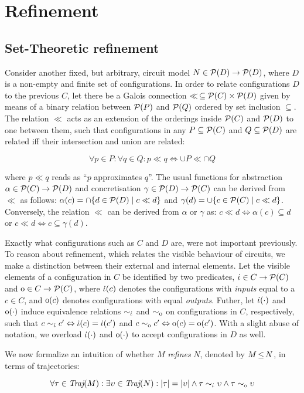 \section{Refinement}

\subsection{Set-Theoretic refinement}

Consider another fixed, but arbitrary, circuit model $N \in \mathcal{P}(D) \rightarrow \mathcal{P}(D)$, where $D$ is a non-empty and finite set of configurations. In order to relate configurations $D$ to the previous $C$, let there be a Galois connection $\ll \, \subseteq \mathcal{P}(C) \times \mathcal{P}(D)$ given by means of a binary relation between $\mathcal{P}(P)$ and $\mathcal{P}(Q)$ ordered by set inclusion $\subseteq$. The relation $\ll$ acts as an extension of the orderings inside $\mathcal{P}(C)$ and $\mathcal{P}(D)$ to one between them, such that configurations in any $P \subseteq \mathcal{P}(C)$ and $Q \subseteq \mathcal{P}(D)$ are related iff their intersection and union are related:

\begin{equation*}
\forall p \in P : \forall q \in Q : p \ll q \iff \cup P \ll \cap Q
\end{equation*}

\noindent where $p \ll q$ reads as ``$p$ approximates $q$''. The usual functions for abstraction $\alpha \in \mathcal{P}(C) \rightarrow \mathcal{P}(D)$ and concretisation $\gamma \in \mathcal{P}(D) \rightarrow \mathcal{P}(C)$ can be derived from $\ll$ as follows: $\alpha(c) = \cap \{ d \in \mathcal{P}(D) \mid c \ll d \}$ and $\gamma(d) = \cup \{ c \in \mathcal{P}(C) \mid c \ll d \}$. Conversely, the relation $\ll$ can be derived from $\alpha$ or $\gamma$ as: $c \ll d \iff \alpha(c) \subseteq d$ or $c \ll d \iff c \subseteq \gamma(d)$. 

Exactly what configurations such as $C$ and $D$ are, were not important previously. To reason about refinement, which relates the visible behaviour of circuits, we make a distinction between their external and internal elements. Let the visible elements of a configuration in $C$ be identified by two predicates, $\dot{\iota} \in C \rightarrow \mathcal{P}(C)$ and $\mathrm{o} \in C \rightarrow \mathcal{P}(C)$, where $\dot{\iota}(c)$ denotes the configurations with \textit{inputs} equal to a $c \in C$, and $\mathrm{o}(c)$ denotes configurations with equal \textit{outputs}. Futher, let $\dot{\iota}(\cdot)$ and $\mathrm{o}(\cdot)$ induce equivalence relations $\sim_{\dot{\iota}}$ and $\sim_{\mathrm{o}}$ on configurations in $C$, respectively, such that $c \sim_{\dot{\iota}} c' \Leftrightarrow \dot{\iota}(c) = \dot{\iota}(c')$ and $c \sim_{\mathrm{o}} c' \Leftrightarrow \mathrm{o}(c) = \mathrm{o}(c')$. With a slight abuse of notation, we overload $\dot{\iota}(\cdot)$ and $\mathrm{o}(\cdot)$ to accept configurations in $D$ as well.

We now formalize an intuition of whether $M$ \textit{refines} $N$, denoted by $M \operatorname{\leq} N$, in terms of trajectories:

\begin{equation*}
\forall \tau \in \operatorname{\textit{Traj}}(M) : \exists \upsilon \in \operatorname{\textit{Traj}}(N) : | \tau | = | \upsilon | \wedge \tau \sim_{\dot{\iota}} \upsilon \wedge \tau \sim_{\mathrm{o}} \upsilon
\end{equation*}
